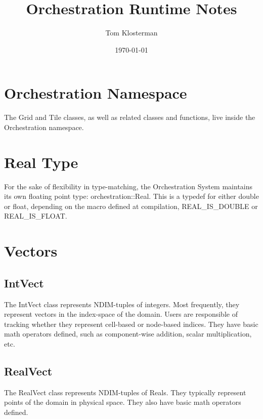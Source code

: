 \documentclass[letterpaper,12pt]{article}
\begin{document}
\title{Orchestration Runtime Notes}
\author{Tom Klosterman}
\date{\today}
\maketitle

\begin{abstract}

\end{abstract}


\section{Orchestration Namespace}

The Grid and Tile classes, as well as related classes and functions, live inside the Orchestration namespace.


\section{Real Type}

For the sake of flexibility in type-matching, the Orchestration System maintains its own floating point type: orchestration::Real. This is a typedef for either double or float, depending on the macro defined at compilation, REAL\_IS\_DOUBLE or REAL\_IS\_FLOAT.

\section{Vectors}
\subsection{IntVect}

The IntVect class represents NDIM-tuples of integers. Most frequently, they represent vectors in the index-space of the domain. Users are responsible of tracking whether they represent cell-based or node-based indices. They have basic math operators defined, such as component-wise addition, scalar multiplication, etc.



\subsection{RealVect}

The RealVect class represents NDIM-tuples of Reals. They typically represent points of the domain in physical space. They also have basic math operators defined.
\end{document}
